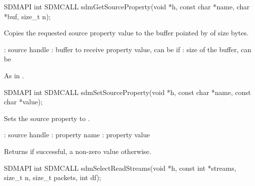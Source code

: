 \documentclass[a4paper,12pt,twoside,extrafontsizes]{memoir}
\begin{document}

\begin{cfuncprototype}
SDMAPI int SDMCALL sdmGetSourceProperty(void *h, const char *name, char *buf, size_t n);
\end{cfuncprototype}

\begin{funcdescr}
	Copies the requested source property value to the buffer pointed by  of size  bytes.
\end{funcdescr}

\begin{funcparams}
	: source handle
	: buffer to receive property value, can be  if 
	: size of the buffer, can be 
\end{funcparams}

\begin{funcret}
	As in .
\end{funcret}



\begin{cfuncprototype}
SDMAPI int SDMCALL sdmSetSourceProperty(void *h, const char *name, const char *value);
\end{cfuncprototype}

\begin{funcdescr}
	Sets the source property  to .
\end{funcdescr}

\begin{funcparams}
	: source handle
	: property name
	: property value
\end{funcparams}

\begin{funcret}
	Returns  if successful, a non-zero value otherwise.
\end{funcret}



\begin{cfuncprototype}
SDMAPI int SDMCALL sdmSelectReadStreams(void *h, const int *streams, size_t n, size_t packets, int df);
\end{cfuncprototype}
\end{document}
